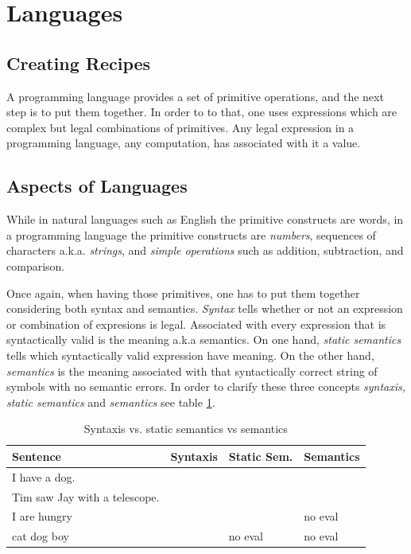 \documentclass[a4paper]{article}
\newcommand{\xmark}{\ding{55}}%
\newcommand{\cmark}{\ding{51}}%
\begin{document}
\section{Languages}

\subsection{Creating Recipes}

A programming language provides a set of primitive operations, and the next
step is to put them together. In order to to that, one uses expressions which
are complex but legal combinations of primitives. Any legal expression in a
programming language, any computation, has associated with it a value.

\subsection{Aspects of Languages}

While in natural languages such as English the primitive constructs are words,
in a programming language the primitive constructs are \textit{numbers},
sequences of characters a.k.a. \textit{strings}, and \textit{simple operations}
such as addition, subtraction, and comparison.

Once again, when having those primitives, one has to put them together
considering both syntax and semantics. \textit{Syntax} tells whether or not an
expression or combination of expresions is legal. Associated with every
expression that is syntactically valid is the meaning a.k.a semantics.
On one hand, \textit{static semantics} tells which syntactically valid expression
have meaning. On the other hand, \textit{semantics} is the meaning associated
with that syntactically correct string of symbols with no semantic errors.
In order to clarify these three concepts \textit{syntaxis, static semantics}
and \textit{semantics} see table \ref{table:languages}.

\begin{table}[!h]
\begin{center}
  \begin{tabular}{|p{4.5cm}|p{1.50cm}|p{1.8cm}|p{1.75cm}|}
    \hline
    Sentence & Syntaxis & Static Sem. & Semantics\\
    \hline
    I have a dog. & \cmark & \cmark & \cmark\\
    \hline
    Tim saw Jay with a telescope. & \cmark & \cmark & \xmark\\
    \hline
    I are hungry & \cmark & \xmark & no eval\\
    \hline
    cat dog boy & \xmark & no eval & no eval\\
    \hline
  \end{tabular}
\caption{Syntaxis vs. static semantics vs semantics}
\label{table:languages}
\end{center}
\end{table}
\end{document}
